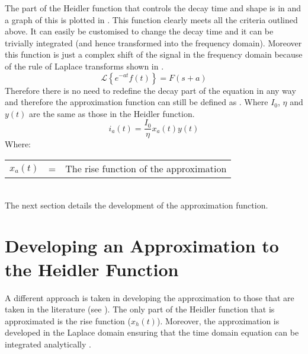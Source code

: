 The part of the Heidler function that controls the decay time and shape is in  and a graph of this is plotted in . This function clearly meets all the criteria outlined above. It can easily be customised to change the decay time and it can be trivially integrated (and hence transformed into the frequency domain).
Moreover this function is just a complex shift of the signal in the frequency domain because of the rule of Laplace transforms shown in  \cite{bkSST,bkControl}.
\begin{equation}
    \mathcal{L} \left \{ e^{-at}f\left ( t \right ) \right \} = F \left (s + a \right )
    \label{eqn:laplaceComplexShift}
\end{equation}
Therefore there is no need to redefine the decay part of the equation in any way and therefore the approximation function can still be defined as . Where $I_0$, $\eta$ and $y(t)$ are the same as those in the Heidler function.
\begin{equation}
i_a \left( t \right) = \frac{I_0}{\eta} x_a \left( t \right) y \left( t \right)
\label{eqn:PreTFSmall}
\end{equation}
Where: \\
\begin{tabular}{cll}
    $x_a \left( t \right)$ & = & The rise function of the approximation
\end{tabular}\\

The next section details the development of the approximation function.


\section{Developing an Approximation to the Heidler Function}
\label{sec:approx_methodology}
A different approach is taken in developing the approximation to those that are taken in the literature (see ). The only part of the Heidler function that is approximated is the rise function ($x_h(t)$). Moreover, the approximation is developed in the Laplace domain ensuring that the time domain equation can be integrated analytically \cite{Terespolsky2014}.

